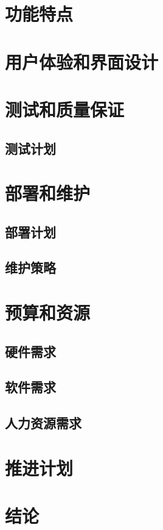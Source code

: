 \documentclass{article}
\begin{document}
\section{功能特点}


\section{用户体验和界面设计}

\section{测试和质量保证}
\subsection{测试计划}
\section{部署和维护}
\subsection{部署计划}
\subsection{维护策略}

\section{预算和资源}
\subsection{硬件需求}
\subsection{软件需求}
\subsection{人力资源需求}

\section{推进计划}

\section{结论}
\end{document}
